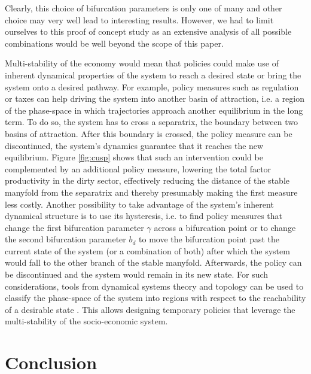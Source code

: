 
Clearly, this choice of bifurcation parameters is only one of many and other choice may very well lead to interesting results. However, we had to limit ourselves to this proof of concept study as an extensive analysis of all possible combinations would be well beyond the scope of this paper.


Multi-stability of the economy would mean that policies could make use of inherent dynamical properties of the system to reach a desired state or bring the system onto a desired pathway. For example, policy measures such as regulation or taxes can help driving the system into another basin of attraction, i.e. a region of the phase-space in which trajectories approach another equilibrium in the long term. To do so, the system has to cross a separatrix, the boundary between two basins of attraction.
After this boundary is crossed, the policy measure can be discontinued, the system's dynamics guarantee that it reaches the new equilibrium. 
Figure \ref{fig:cusp} shows that such an intervention could be complemented by an additional policy measure, lowering the total factor productivity in the dirty sector, effectively reducing the distance of the stable manyfold from the separatrix and thereby presumably making the first measure less costly.
Another possibility to take advantage of the system's inherent dynamical structure is to use its hysteresis, i.e. to find policy measures that change the first bifurcation parameter $\gamma$ across a bifurcation point or to change the second bifurcation parameter $b_d$ to move the bifurcation point past the current state of the system (or a combination of both) after which the system would fall to the other branch of the stable manyfold. Afterwards, the policy can be discontinued and the system would remain in its new state.
For such considerations, tools from dynamical systems theory and topology can be used to classify the phase-space of the system into regions with respect to the reachability of a desirable state \citep{Heitzig2016,Nitzbon2017}. This allows designing temporary policies that leverage the multi-stability of the socio-economic system.

\section{Conclusion}

